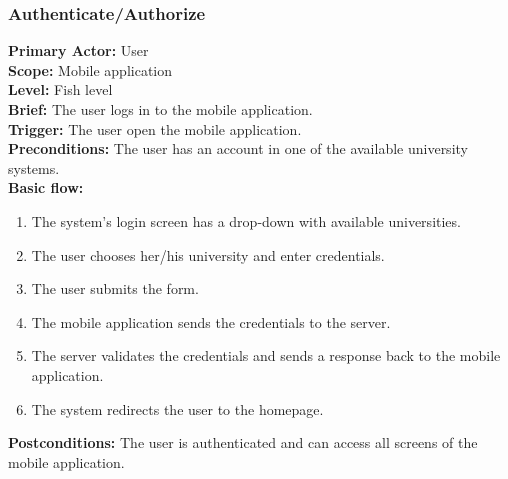 \subsubsection{\large{Authenticate/Authorize}}
\textbf{Primary Actor:} User\\
\textbf{Scope:} Mobile application\\
\textbf{Level:} Fish level\\
\textbf{Brief:} The user logs in to the mobile application.\\
\textbf{Trigger:} The user open the mobile application.\\
\textbf{Preconditions:}
The user has an account in one of the available university systems.\\
\textbf{Basic flow:}
\begin{enumerate}
    \item The system's login screen has a drop-down with available universities.
    \item The user chooses her/his university and enter credentials.
    \item The user submits the form.
    \item The mobile application sends the credentials to the server.
    \item The server validates the credentials and sends a response back to the mobile application.
    \item The system redirects the user to the homepage.
\end{enumerate}
\textbf{Postconditions:}
The user is authenticated and can access all screens of the mobile application.


